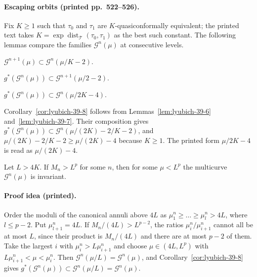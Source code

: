 \paragraph{Escaping orbits (printed pp.~522--526).}
Fix $K\ge1$ such that $\tau_0$ and $\tau_1$ are $K$-quasiconformally equivalent; the printed text takes
$K=\exp\operatorname{dist}_{\mathcal T}(\tau_0,\tau_1)$ as the best such constant.  The following lemmas
compare the families $\mathcal G^n(\mu)$ at consecutive levels.

\begin{lemma}
\label{lem:lyubich-39-6}
$\mathcal G^{n+1}(\mu)\subset\mathcal G^n(\mu/K-2)$.
\end{lemma}

\begin{lemma}
\label{lem:lyubich-39-7}
$g^*(\mathcal G^n(\mu))\subset\mathcal G^{n+1}(\mu/2-2)$.
\end{lemma}

\begin{corollary}
\label{cor:lyubich-39-8}
$g^*(\mathcal G^n(\mu))\subset\mathcal G^n(\mu/2K-4)$.
\end{corollary}

Corollary~\ref{cor:lyubich-39-8} follows from Lemmas~\ref{lem:lyubich-39-6} and~\ref{lem:lyubich-39-7}.  Their
composition gives $g^*(\mathcal G^n(\mu))\subset\mathcal G^n(\mu/(2K)-2/K-2)$, and
$\mu/(2K)-2/K-2\ge\mu/(2K)-4$ because $K\ge1$.  The printed form $\mu/2K-4$ is read as $\mu/(2K)-4$.

\begin{lemma}
\label{lem:lyubich-39-9}
Let $L>4K$.  If $M_n>L^p$ for some $n$, then for some $\mu<L^p$ the multicurve $\mathcal G^n(\mu)$ is invariant.
\end{lemma}

\paragraph{Proof idea (printed).}
Order the moduli of the canonical annuli above $4L$ as $\mu^n_1\ge\dots\ge\mu^n_l>4L$, where $l\le p-2$.
Put $\mu^n_{l+1}=4L$.  If $M_n/(4L)>L^{p-2}$, the ratios $\mu^n_i/\mu^n_{i+1}$ cannot all be at most $L$,
since their product is $M_n/(4L)$ and there are at most $p-2$ of them.  Take the largest $i$ with
$\mu^n_i>L\mu^n_{i+1}$ and choose $\mu\in(4L,L^p)$ with $L\mu^n_{i+1}<\mu<\mu^n_i$.  Then
$\mathcal G^n(\mu/L)=\mathcal G^n(\mu)$, and Corollary~\ref{cor:lyubich-39-8} gives
$g^*(\mathcal G^n(\mu))\subset\mathcal G^n(\mu/L)=\mathcal G^n(\mu)$.

